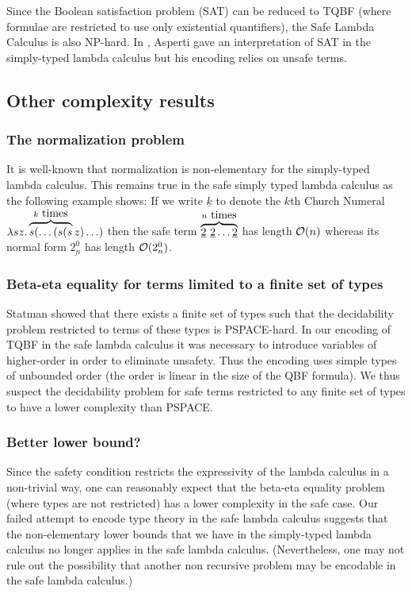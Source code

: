 \begin{remark}
Since the Boolean satisfaction problem (SAT) can be reduced to TQBF (where formulae are restricted to use only existential quantifiers), the Safe Lambda Calculus is also NP-hard. In \cite{asperti-np}, Asperti gave an interpretation of SAT in the simply-typed lambda calculus but his encoding relies on unsafe terms.
\end{remark}

\subsection{Other complexity results}


\subsubsection{The normalization problem}
It is well-known that normalization is non-elementary for the
simply-typed lambda calculus. This remains true in the safe simply
typed lambda calculus as the following example shows: If we write
$\underline{k}$ to denote the $k$th Church Numeral $\lambda s z .
\overbrace{s( \ldots (s (s}^{k\hbox{ times}}z) \ldots)$ then the
safe term $\overbrace{\underline{2}~\underline{2}\ldots
\underline{2}}^{n\hbox{ times}}$ has length $\mathcal{O}(n)$ whereas its
normal form $\underline{2_n^0}$ has length $\mathcal{O}(2_n^0)$.

\subsubsection{Beta-eta equality for terms limited to a finite set of types}
Statman showed \cite{Statman:1979:TLE} that there exists a finite
set of types such that the decidability problem restricted to terms
of these types is PSPACE-hard. In our encoding of TQBF in the safe
lambda calculus it was necessary to introduce variables of
higher-order in order to eliminate unsafety. Thus the encoding uses
simple types of unbounded order (the order is linear in the size of
the QBF formula). We thus suspect the decidability problem for safe
terms restricted to any finite set of types to have a lower
complexity than PSPACE.

\subsubsection{Better lower bound?}
Since the safety condition restricts the expressivity of the lambda
calculus in a non-trivial way, one can reasonably expect that the
beta-eta equality problem (where types are not restricted) has a
lower complexity in the safe case. Our failed attempt to encode type
theory in the safe lambda calculus suggests that the non-elementary
lower bounds that we have in the simply-typed lambda calculus no
longer applies in the safe lambda calculus. (Nevertheless, one may
not rule out the possibility that another non recursive problem may
be encodable in the safe lambda calculus.)

